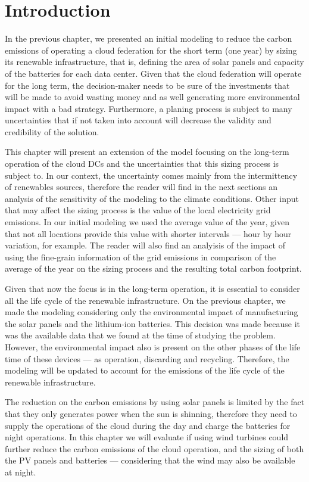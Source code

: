 \section{Introduction}

In the previous chapter, we presented an initial modeling to reduce the carbon emissions of operating a cloud federation for the short term (one year) by sizing its renewable infrastructure, that is, defining the area of solar panels and capacity of the batteries for each data center.  Given that the cloud federation will operate for the long term, the decision-maker needs to be sure of the investments that will be made to avoid wasting money and as well generating more environmental impact with a bad strategy. Furthermore, a planing process is subject to many uncertainties that if not taken into account will decrease the validity and credibility of the solution.

This chapter will present an extension of the model focusing on the long-term operation of the cloud DCs and the uncertainties that this sizing process is subject to. In our context, the uncertainty comes mainly from the intermittency of renewables sources, therefore the reader will find in the next sections an analysis of the sensitivity of the modeling to the climate conditions.  Other input that may affect the sizing process is the value of the local electricity grid emissions. In our initial modeling we used the average value of the year, given that not all locations provide this value with shorter intervals --- hour by hour variation, for example. The reader will also find an analyisis of the impact of using the fine-grain information of the grid emissions in comparison of the average of the year on the sizing process and the resulting total carbon footprint.

Given that now the focus is in the long-term operation, it is essential to consider all the life cycle of the renewable infrastructure. On the previous chapter, we made the modeling considering only the environmental impact of manufacturing the solar panels and the lithium-ion batteries. This decision was made because it was the available data that we found at the time of studying the problem. However, the environmental impact also is present on the other phases of the life time of these devices --- as operation, discarding and recycling. Therefore, the modeling will be updated to account for the emissions of the life cycle of the renewable infrastructure. 

The reduction on the carbon emissions by using solar panels is limited by the fact that they only generates power when the sun is shinning, therefore they need to supply the operations of the cloud during the day and charge the batteries for night operations. In this chapter we will evaluate if using wind turbines could further reduce the carbon emissions of the cloud operation, and the sizing of both the PV panels and batteries --- considering that the wind may also be available at night.

